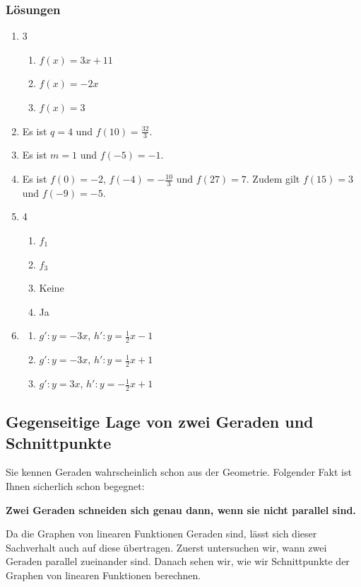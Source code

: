 \subsubsection{Lösungen}
\begin{enumerate}
    \item \begin{multicols}{3}
              \begin{enumerate}
                  \item $f(x) = 3x + 11$
                  \item $f(x) = -2x$
                  \item $f(x) = 3$
              \end{enumerate}
          \end{multicols}
    \item Es ist $q = 4$ und $f(10) = \frac{32}{3}$.
    \item Es ist $m = 1$ und $f(-5) = -1$.
    \item Es ist $f(0) = -2$, $f(-4) = -\frac{10}{3}$ und $f(27) = 7$. Zudem gilt $f(15) = 3$ und $f(-9) = -5$.
    \item \begin{multicols}{4}
              \begin{enumerate}
                  \item $f_{1}$
                  \item $f_{3}$
                  \item Keine
                  \item Ja
              \end{enumerate}
          \end{multicols}
    \item \begin{enumerate}
              \item $g': y = -3x$, \quad $h': y = \frac{1}{2}x - 1$
              \item $g': y = -3x$, \quad $h': y = \frac{1}{2}x + 1$
              \item $g': y = 3x$, \quad $h': y = -\frac{1}{2}x + 1$
          \end{enumerate}
\end{enumerate}
\newpage

\subsection{Gegenseitige Lage von zwei Geraden und Schnittpunkte}
Sie kennen Geraden wahrscheinlich schon aus der Geometrie. Folgender Fakt ist Ihnen sicherlich schon begegnet:
\begin{center}
    \textbf{Zwei Geraden schneiden sich genau dann, wenn sie nicht parallel sind.}
\end{center}
Da die Graphen von linearen Funktionen Geraden sind, lässt sich dieser Sachverhalt auch auf diese übertragen. Zuerst untersuchen wir, wann zwei Geraden parallel zueinander sind. Danach sehen wir, wie wir Schnittpunkte der Graphen von linearen Funktionen berechnen.

